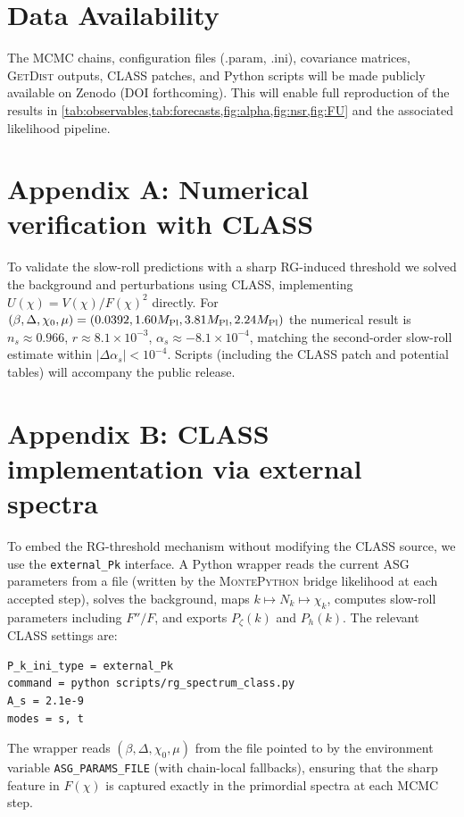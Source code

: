 \documentclass[11pt,a4paper]{article}
\begin{document}
\section{Data Availability}
\label{sec:data}
The MCMC chains, configuration files (.param, .ini), covariance matrices, \textsc{GetDist} outputs, \textsc{CLASS} patches, and Python scripts will be made publicly available on Zenodo (DOI forthcoming). This will enable full reproduction of the results in \cref{tab:observables,tab:forecasts,fig:alpha,fig:nsr,fig:FU} and the associated likelihood pipeline.

\appendix

\section{Appendix A: Numerical verification with CLASS}
To validate the slow-roll predictions with a sharp RG-induced threshold we solved the background and perturbations using \textsc{CLASS}, implementing $U(\chi)=V(\chi)/F(\chi)^{2}$ directly. For $(\beta,\Delta,\chi_{0},\mu)=(0.0392,1.60M_{\rm Pl},3.81M_{\rm Pl},2.24M_{\rm Pl})$ the numerical result is $n_{s}\approx0.966$, $r\approx8.1\times10^{-3}$, $\alpha_{s}\approx-8.1\times10^{-4}$, matching the second-order slow-roll estimate within $|\Delta\alpha_{s}|<10^{-4}$. Scripts (including the \textsc{CLASS} patch and potential tables) will accompany the public release.

\section{Appendix B: CLASS implementation via external spectra}
To embed the RG-threshold mechanism without modifying the \textsc{CLASS} source, we use the \texttt{external\_Pk} interface. A Python wrapper reads the current ASG parameters from a file (written by the \textsc{MontePython} bridge likelihood at each accepted step), solves the background, maps $k\mapsto N_{k}\mapsto \chi_{k}$, computes slow-roll parameters including $F''/F$, and exports $P_{\zeta}(k)$ and $P_{h}(k)$. The relevant \textsc{CLASS} settings are:
\begin{verbatim}
P_k_ini_type = external_Pk
command = python scripts/rg_spectrum_class.py
A_s = 2.1e-9
modes = s, t
\end{verbatim}
The wrapper reads $(\beta,\Delta,\chi_0,\mu)$ from the file pointed to by the environment variable \texttt{ASG\_PARAMS\_FILE} (with chain-local fallbacks), ensuring that the sharp feature in $F(\chi)$ is captured exactly in the primordial spectra at each MCMC step.
\end{document}

